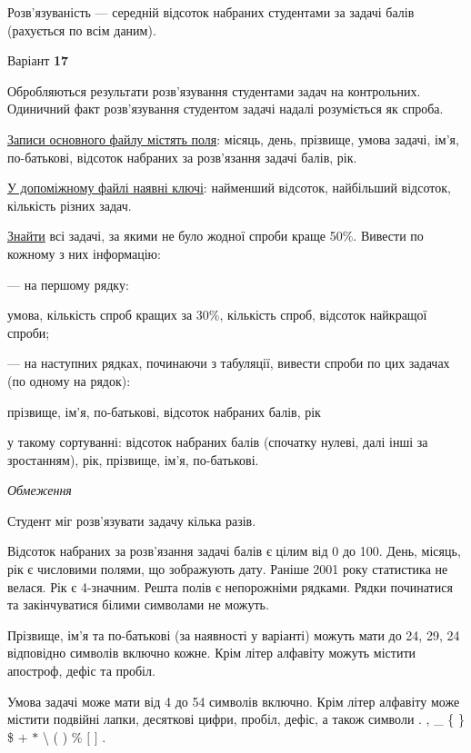 \documentclass[11pt, ukrainian]{article}
\begin{document}
Розв'язуваність --- середній відсоток набраних студентами за задачі балів (рахується по всім даним).


\par
\newpage
{\center Варіант  \No \textbf { 17 }\par}
\bigskip
Обробляються результати розв’язування студентами задач на контрольних.
Одиничний факт роз\-в’я\-зу\-вання студентом задачі надалі розуміється як спроба.

\underline{Записи основного файлу містять поля}: місяць, день, прізвище, умова задачі, ім’я, по-батькові, відсоток набраних за розв’язання задачі балів, рік.

\underline{У допоміжному файлі наявні ключі}: найменший відсоток, найбільший відсоток, кількість різних задач.

\underline{Знайти} всі задачі, за якими не було жодної спроби краще 50\%. Вивести по кожному з них інформацію:\par
{\noindent}--- на першому рядку:\par
умова, кількість спроб кращих за 30\%, кількість спроб, відсоток найкращої спроби;

{\noindent}--- на наступних рядках, починаючи з табуляції, вивести спроби по цих задачах (по одному на рядок):\par
прізвище, ім’я, по-батькові, відсоток набраних балів, рік

{\noindent}у такому сортуванні: відсоток набраних балів (спочатку нулеві, далі інші за зростанням), рік, прізвище, ім’я, по-батькові.


\bigskip\textit{Обмеження}

Студент міг розв’язувати задачу кілька разів.

Відсоток набраних за розв’язання задачі балів є цілим від 0 до 100.
День, місяць, рік є числовими полями, що зображують дату.
Раніше 2001 року статистика не велася. Рік є 4-значним.
Решта полів є непорожніми рядками.
Рядки починатися та закінчуватися білими символами не можуть.

Прізвище, ім’я та по-батькові (за наявності у варіанті) можуть мати до 24, 29, 24 відповідно символів включно кожне. 
Крім літер алфавіту можуть містити апостроф, дефіс та пробіл.

Умова задачі може мати від 4 до 54 символів включно.
Крім літер алфавіту може містити подвійні лапки, десяткові цифри, пробіл, дефіс,
а також символи . , \_ \{ \} \$ $+$ $*$ {\textbackslash} ( ) \% $[$ $]$ .
\end{document}
